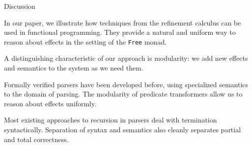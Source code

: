\documentclass[ignorenonframetext,]{beamer}
\newcommand{\Agda}[1]{\texttt{#1}\xspace}
\begin{document}
\begin{frame}{Discussion}

In our paper, we illustrate how techniques from the refinement calculus can be used in functional programming.
They provide a natural and uniform way to reason about effects in the setting of the \Agda{Free} monad.

A distinguishing characteristic of our approach is modularity:
we add new effects and semantics to the system as we need them.

Formally verified parsers have been developed before,
using specialized semantics to the domain of parsing.
The modularity of predicate transformers allow us to reason about effects uniformly.

Most existing approaches to recursion in parsers deal with termination syntactically.
Separation of syntax and semantics also cleanly separates partial and total correctness.

\end{frame}
\end{document}
